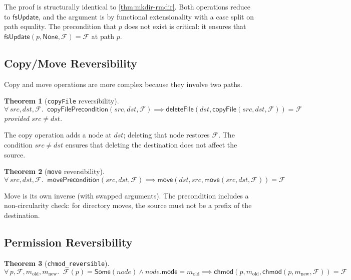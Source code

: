 \documentclass[11pt,a4paper]{article}
\newtheorem{theorem}{Theorem}[section]
\newcommand{\FS}{\mathcal{F}}
\begin{document}
The proof is structurally identical to \cref{thm:mkdir-rmdir}. Both operations
reduce to $\mathsf{fsUpdate}$, and the argument is by functional extensionality
with a case split on path equality. The precondition that $p$ does not exist
is critical: it ensures that $\mathsf{fsUpdate}(p, \mathsf{None}, \FS) = \FS$
at path $p$.

\subsection{Copy/Move Reversibility}

Copy and move operations are more complex because they involve two paths.

\begin{theorem}[\texttt{copyFile} reversibility]
\label{thm:copy}
\[
  \forall\, \mathit{src}, \mathit{dst}, \FS.\;\;
  \mathsf{copyFilePrecondition}(\mathit{src}, \mathit{dst}, \FS) \implies
  \mathsf{deleteFile}(\mathit{dst},
    \mathsf{copyFile}(\mathit{src}, \mathit{dst}, \FS)) = \FS
\]
provided $\mathit{src} \neq \mathit{dst}$.
\end{theorem}

The copy operation adds a node at $\mathit{dst}$; deleting that node restores
$\FS$. The condition $\mathit{src} \neq \mathit{dst}$ ensures that deleting
the destination does not affect the source.

\begin{theorem}[\texttt{move} reversibility]
\label{thm:move}
\[
  \forall\, \mathit{src}, \mathit{dst}, \FS.\;\;
  \mathsf{movePrecondition}(\mathit{src}, \mathit{dst}, \FS) \implies
  \mathsf{move}(\mathit{dst}, \mathit{src},
    \mathsf{move}(\mathit{src}, \mathit{dst}, \FS)) = \FS
\]
\end{theorem}

Move is its own inverse (with swapped arguments). The precondition includes a
non-circularity check: for directory moves, the source must not be a prefix of
the destination.

\subsection{Permission Reversibility}

\begin{theorem}[\texttt{chmod\_reversible}]
\label{thm:chmod}
\[
  \forall\, p, \FS, m_{\text{old}}, m_{\text{new}}.\;\;
  \FS(p) = \mathsf{Some}(\mathit{node}) \land
  \mathit{node}.\mathsf{mode} = m_{\text{old}}
  \implies
  \mathsf{chmod}(p, m_{\text{old}},
    \mathsf{chmod}(p, m_{\text{new}}, \FS)) = \FS
\]
\end{theorem}
\end{document}

